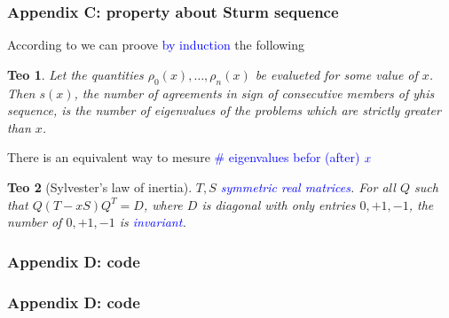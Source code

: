 \documentclass{beamer}
\newcommand{\tc}{ $ such that $ }
\theoremstyle{definition} \newtheorem{de}{Def}
\theoremstyle{remark} \newtheorem{os}[de]{Remark}
\theoremstyle{plain} \newtheorem{te}[de]{Teo}
\theoremstyle{plain} \newtheorem{co}[de]{Cor}
\theoremstyle{plain} \newtheorem{pr}[de]{Prop}
\theoremstyle{plain} \newtheorem{lem}[de]{Lemm}
\theoremstyle{remark} \newtheorem{rem}[de]{Remark}
\begin{document}
\begin{frame}[label=SturmSequence]
  \frametitle{Appendix C: property about Sturm sequence}

  According to \cite[p.300]{bookWilkinson} we can proove \textcolor{blue}{by induction} the following

  \begin{te}
    Let the quantities $\rho_0(x),\dots,\rho_n(x)$ be evalueted for some value of $x$. Then $s(x)$, the number of agreements in sign of consecutive members of yhis sequence, is the number of eigenvalues of the problems which are strictly greater than $x$.
  \end{te}

  \pause

  There is an equivalent way to mesure \textcolor{blue}{\# eigenvalues befor (after)} $\textcolor{blue}{x}$
  
  \begin{te}[Sylvester's law of inertia]
   $T,S$ \textcolor{blue}{symmetric real matrices}. For all $Q \tc Q(T-xS)Q^{T}=D$, where $D$ is diagonal with only entries $0,+1,-1$, the number of $0,+1,-1$ is \textcolor{blue}{invariant}. 
  \end{te}
  
  \hyperlink{BeforeSturmSequence}{}

\end{frame}


\begin{frame}[label=CodeIf]
  \frametitle{Appendix D: code}

\end{frame}


\begin{frame}
  \frametitle{Appendix D: code}

  \hyperlink{BeforeCodeIf}{}
\end{frame}


\begin{frame}
  
  
\end{frame}




\end{document}
